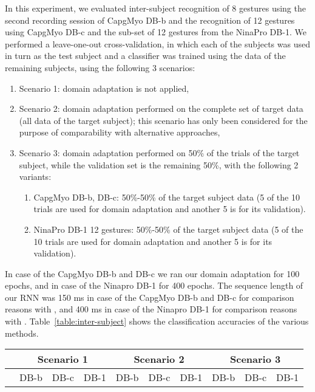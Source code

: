 \documentclass[conference]{IEEEtran}
\begin{document}
{\begin{minipage}{\textwidth}
In this experiment,
we evaluated inter-subject recognition of 8 gestures using the second recording session of CapgMyo DB-b and the recognition of 12 gestures using CapgMyo DB-c and the sub-set of 12 gestures from the NinaPro DB-1.
We performed a leave-one-out cross-validation,
in which each of the subjects was used in turn as the test subject and a classifier was trained using the data of the remaining subjects, using the following 3 scenarios:
\begin{enumerate}
	\item Scenario 1: domain adaptation is not applied,
	\item Scenario 2: domain adaptation performed on the complete set of target data (all data of the target subject); this scenario has only been considered for the purpose of comparability with alternative approaches,
	\item Scenario 3: domain adaptation performed on 50\% of the trials of the target subject, while the validation set is the remaining 50\%, with the following 2 variants:
	\begin{enumerate}
		\item CapgMyo DB-b, DB-c: 50\%-50\% of the target subject data (5 of the 10 trials are used for domain adaptation and another 5 is for its validation).
		\item NinaPro DB-1 12 gestures: 50\%-50\% of the target subject data (5 of the 10 trials are used for domain adaptation and another 5 is for its validation).
	\end{enumerate}
\end{enumerate}
In case of the CapgMyo DB-b and DB-c we ran our domain adaptation for 100 epochs, and in case of the Ninapro DB-1 for 400 epochs.
The sequence length of our RNN was 150 ms in case of the CapgMyo DB-b and DB-c for comparison reasons with \cite{b18}, and 400 ms in case of the Ninapro DB-1 for comparison reasons with \cite{b7}.
Table~\ref{table:inter-subject} shows the classification accuracies of the various methods.
\begin{table}[tpb]
	\centering
	\begin{threeparttable}
		\setlength{\tabcolsep}{1pt}
		\def\arraystretch{1.5}\begin{tabular}{|c|c|c|c|c|c|c|c|c|c|} 
			\hline
			& \multicolumn{3}{|c|}{Scenario 1} & \multicolumn{3}{|c|}{Scenario 2} & \multicolumn{3}{|c|}{Scenario 3} \\
			\hline
			& DB-b & DB-c & DB-1 & DB-b & DB-c & DB-1 & DB-b & DB-c & DB-1 \\

\end{tabular}
\end{threeparttable}
\end{table}
\end{minipage}}
\end{document}
